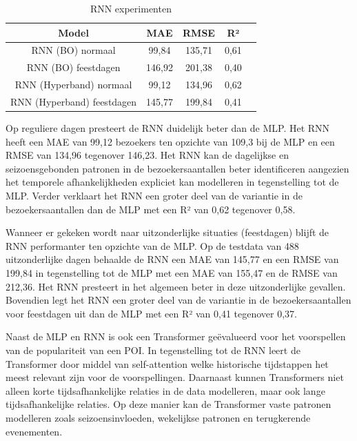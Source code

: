 \begin{table}[H]
    \centering
    \begin{tabular}{|c|c|c|c|c|}
        \hline
        \textbf{Model} & MAE & RMSE & R² \\ \hline
        RNN (BO) normaal & 99,84  & 135,71 & 0,61  \\ \hline
        RNN (BO) feestdagen & 146,92  & 201,38 & 0,40  \\ \hline
        RNN (Hyperband) normaal & 99,12  & 134,96 & 0,62   \\ \hline
        RNN (Hyperband) feestdagen & 145,77  & 199,84 & 0,41  \\ \hline
    \end{tabular}
    \caption{RNN experimenten}
\end{table}

Op reguliere dagen presteert de RNN duidelijk beter dan de MLP. Het RNN heeft een MAE van 99,12 bezoekers ten opzichte van 109,3 bij de MLP en een RMSE van 134,96 tegenover 146,23. Het RNN kan de dagelijkse en seizoensgebonden patronen in de bezoekersaantallen beter identificeren aangezien het temporele afhankelijkheden expliciet kan modelleren in tegenstelling tot de MLP. Verder verklaart het RNN een groter deel van de variantie in de bezoekersaantallen dan de MLP met een R² van 0,62 tegenover 0,58.

Wanneer er gekeken wordt naar uitzonderlijke situaties (feestdagen) blijft de RNN performanter ten opzichte van de MLP. Op de testdata van 488 uitzonderlijke dagen behaalde de RNN een MAE van 145,77 en een RMSE van 199,84 in tegenstelling tot de MLP met een MAE van 155,47 en de RMSE van 212,36. Het RNN presteert in het algemeen beter in deze uitzonderlijke gevallen. Bovendien legt het RNN een groter deel van de variantie in de bezoekersaantallen voor feestdagen uit dan de MLP met een R² van 0,41 tegenover 0,37.

Naast de MLP en RNN is ook een Transformer geëvalueerd voor het voorspellen van de populariteit van een POI. In tegenstelling tot de RNN leert de Transformer door middel van self-attention welke historische tijdstappen het meest relevant zijn voor de voorspellingen. Daarnaast kunnen Transformers niet alleen korte tijdsafhankelijke relaties in de data modelleren, maar ook lange tijdsafhankelijke relaties. Op deze manier kan de Transformer vaste patronen modelleren zoals seizoensinvloeden, wekelijkse patronen en terugkerende evenementen.

